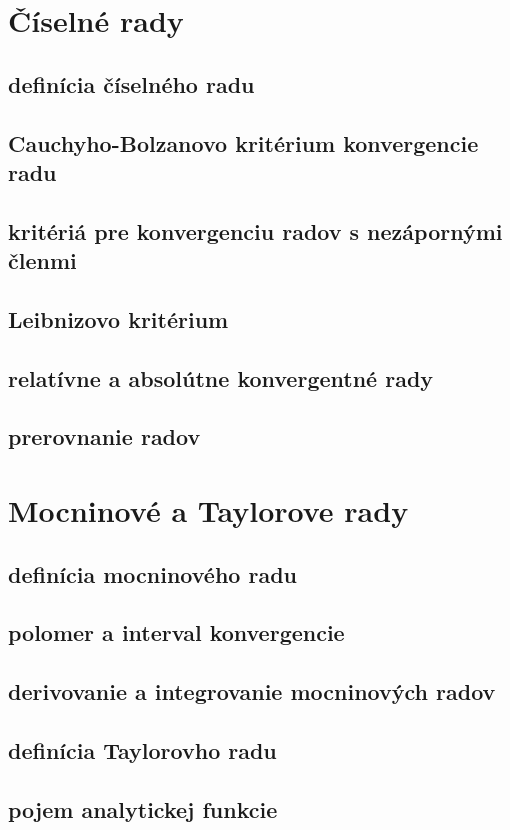 \section{Číselné rady}
\subsection{definícia číselného radu}
\subsection{Cauchyho-Bolzanovo kritérium konvergencie radu}
\subsection{kritériá pre konvergenciu radov s nezápornými členmi}
\subsection{Leibnizovo kritérium}
\subsection{relatívne a absolútne konvergentné rady}
\subsection{prerovnanie radov}


\section{Mocninové a Taylorove rady}
\subsection{definícia mocninového radu}
\subsection{polomer a interval konvergencie}
\subsection{derivovanie a integrovanie mocninových radov}
\subsection{definícia Taylorovho radu}
\subsection{pojem analytickej funkcie}


